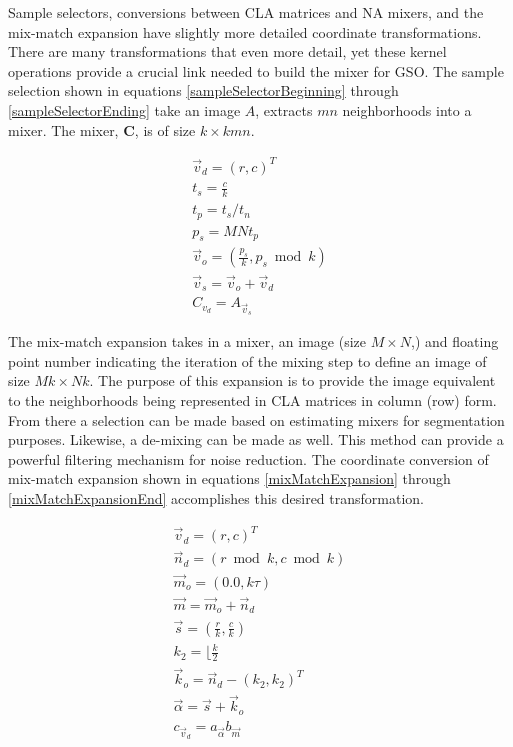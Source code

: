 \documentclass[11pt]{article}
\begin{document}
Sample selectors, conversions between CLA matrices and NA mixers, and the mix-match expansion have slightly more detailed coordinate transformations.  There are many transformations that even more detail, yet these kernel operations provide a crucial link needed to build the mixer for GSO.  The sample selection shown in equations \ref{sampleSelectorBeginning} through \ref{sampleSelectorEnding} take an image $A$, extracts $mn$ neighborhoods into a mixer.  The mixer, $\mathbf{C}$, is of size $k \times kmn$.  

\begin{eqnarray}
	\vec{v}_d = (r, c) ^T \label{sampleSelectorBeginning} \\
	t_s = \frac{c}{k} \\
	t_p = t_s / t_n \\
	p_s = {MN} t_p  \\
	\vec{v}_o = ( \frac{p_s}{k} , p_s \bmod k) \\
	\vec{v}_s = \vec{v}_o + \vec{v}_d \\
	C_{v_d} = A_{\vec{v}_s} \label{sampleSelectorEnding}
\end{eqnarray}

The mix-match expansion takes in a mixer, an image (size $M \times N$,) and floating point number indicating the iteration of the mixing step to define an image of size $Mk \times Nk$.  The purpose of this expansion is to provide the image equivalent to the neighborhoods being represented in CLA matrices in column (row) form.   From there a selection can be made based on estimating mixers for segmentation purposes.  Likewise, a de-mixing can be made as well.  This method can provide a powerful filtering mechanism for noise reduction.  The coordinate conversion of mix-match expansion shown in equations \ref{mixMatchExpansion} through \ref{mixMatchExpansionEnd} accomplishes this desired transformation.

\begin{eqnarray}
\vec{v}_d = (r,c)^T \label{mixMatchExpansion}\\
\vec{n}_d = (r \bmod k, c \bmod k) \\
\vec{m}_o = (0.0, k \tau) \\
\vec{m} = \vec{m}_o + \vec{n}_d \\
\vec{s} = (\frac{r}{k} , \frac{c}{k}) \\
k_2 = \lfloor \frac{k}{2} \\
\vec{k}_o = \vec{n}_d  - (k_2, k_2)^T \\
\vec{\alpha} = \vec{s}  + \vec{k}_o \\
c_{\vec{v}_d} = a_{\vec{\alpha}} b _{\vec{m}} \label{mixMatchExpansionEnd}
\end{eqnarray}
\end{document}
